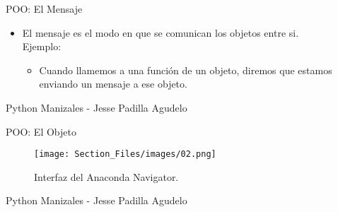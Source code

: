 \begin{frame}{POO: El Mensaje}
\justifying
\begin{itemize}
\item El mensaje es el modo en que se comunican los objetos entre si.\\
Ejemplo:
\begin{itemize}
\item Cuando llamemos a una función de un objeto, diremos que estamos enviando un mensaje a ese objeto.
\end{itemize}
\end{itemize}
{\tiny Python Manizales - Jesse Padilla Agudelo}
\end{frame}

\begin{frame}{POO: El Objeto}
\justifying
\begin{figure}[H]
\centering
\texttt{[image: Section\_Files/images/02.png]}
\caption{Interfaz del Anaconda Navigator.}
\end{figure}
{\tiny Python Manizales - Jesse Padilla Agudelo}
\end{frame}

